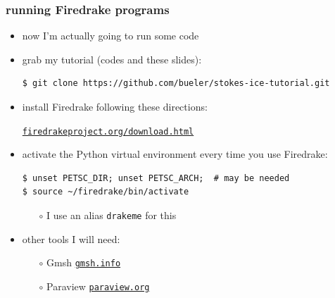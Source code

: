 \documentclass[10pt,
               hyperref={colorlinks,citecolor=DeepPink4,linkcolor=black,urlcolor=blue},
               svgnames]{beamer}
\begin{document}
\begin{frame}[fragile]
\frametitle{running Firedrake programs}

\begin{itemize}
\item now I'm actually going to run some code
\item grab my tutorial (codes and these slides):

\medskip
\begin{Verbatim}[fontsize=\small]
$ git clone https://github.com/bueler/stokes-ice-tutorial.git
\end{Verbatim}

\medskip
\item install Firedrake following these directions:

\begin{center}
\href{https://www.firedrakeproject.org/download.html}{\texttt{firedrakeproject.org/download.html}}
\end{center}
\item activate the Python virtual environment every time you use Firedrake:

\medskip
\begin{Verbatim}[fontsize=\small]
$ unset PETSC_DIR; unset PETSC_ARCH;  # may be needed
$ source ~/firedrake/bin/activate
\end{Verbatim}

\medskip
    \begin{itemize}
    \item[$\circ$] I use an alias \texttt{drakeme} for this
    \end{itemize}
\item other tools I will need:
    \begin{itemize}
    \item[$\circ$] Gmsh \quad \href{https://gmsh.info/}{\texttt{gmsh.info}}
    \item[$\circ$] Paraview \quad \href{https://www.paraview.org/}{\texttt{paraview.org}}
    \end{itemize}
\end{itemize}
\end{frame}
\end{document}

